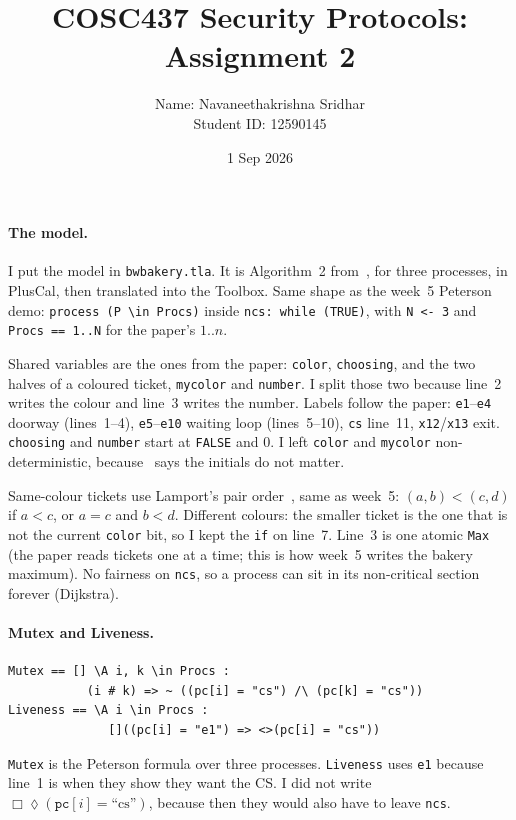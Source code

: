 \documentclass{article}
\title{COSC437 Security Protocols: Assignment 2}
\author{Name: Navaneethakrishna Sridhar \\ Student ID: 12590145}
\date{1 Sep 2026}
\renewcommand{\diamond}{\lozenge} %
\begin{document}
\maketitle

\paragraph{The model.}
I put the model in \texttt{bwbakery.tla}. It is Algorithm~2 from~\cite{taubenfeld}, for three processes, in PlusCal, then translated into the Toolbox. Same shape as the week~5 Peterson demo: \texttt{process (P \textbackslash in Procs)} inside \texttt{ncs: while (TRUE)}, with \texttt{N <- 3} and \texttt{Procs == 1..N} for the paper's $1..n$.

Shared variables are the ones from the paper: \texttt{color}, \texttt{choosing}, and the two halves of a coloured ticket, \texttt{mycolor} and \texttt{number}. I split those two because line~2 writes the colour and line~3 writes the number. Labels follow the paper: \texttt{e1}--\texttt{e4} doorway (lines~1--4), \texttt{e5}--\texttt{e10} waiting loop (lines~5--10), \texttt{cs} line~11, \texttt{x12}/\texttt{x13} exit. \texttt{choosing} and \texttt{number} start at \texttt{FALSE} and $0$. I left \texttt{color} and \texttt{mycolor} non-deterministic, because~\cite{taubenfeld} says the initials do not matter.

Same-colour tickets use Lamport's pair order~\cite{lamport}, same as week~5: $(a,b)<(c,d)$ if $a<c$, or $a=c$ and $b<d$. Different colours: the smaller ticket is the one that is not the current \texttt{color} bit, so I kept the \texttt{if} on line~7. Line~3 is one atomic \texttt{Max} (the paper reads tickets one at a time; this is how week~5 writes the bakery maximum). No fairness on \texttt{ncs}, so a process can sit in its non-critical section forever (Dijkstra).

\paragraph{Mutex and Liveness.}
\begin{verbatim}
Mutex == [] \A i, k \in Procs :
           (i # k) => ~ ((pc[i] = "cs") /\ (pc[k] = "cs"))
Liveness == \A i \in Procs :
              []((pc[i] = "e1") => <>(pc[i] = "cs"))
\end{verbatim}
\texttt{Mutex} is the Peterson formula over three processes. \texttt{Liveness} uses \texttt{e1} because line~1 is when they show they want the CS. I did not write $\Box\diamond(\texttt{pc}[i]=\text{``cs''})$, because then they would also have to leave \texttt{ncs}.
\end{document}

